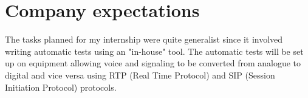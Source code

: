 \section{Company expectations}
The tasks planned for my internship were quite generalist since it
involved writing automatic tests using an "in-house" tool. The automatic
tests will be set up on equipment allowing voice and signaling to be
converted from analogue to digital and vice versa using RTP (Real Time Protocol) and SIP
(Session Initiation Protocol) protocols.